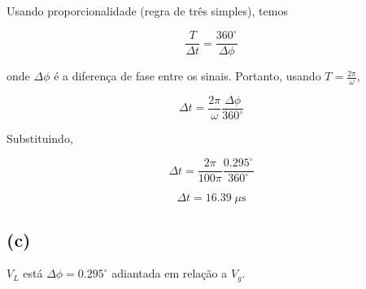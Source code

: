 Usando proporcionalidade (regra de três simples), temos   

\[ \frac{T}{\Delta t} = \frac{360^{\circ}}{\Delta \phi}  \]

onde $\Delta \phi$ é a diferença de fase entre os sinais. Portanto, usando $T = \frac{2\pi}{\omega}$,

\[ \Delta t = \frac{2\pi}{\omega} \frac{\Delta \phi}{360^{\circ}} \]

Substituindo,

\[ \Delta t = \frac{2\pi}{100\pi} \frac{0.295^{\circ}}{360^{\circ}} \]

\[ \boxed{\Delta t = 16.39 \;\mu\textrm{s}} \]

\subsection*{(c)}

$V_L$ está $\Delta \phi = 0.295^{\circ}$ adiantada em relação a $V_g$.










